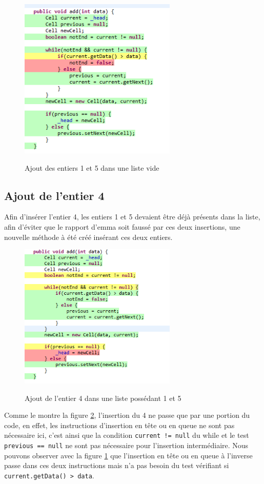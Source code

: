 \documentclass[a4paper, 11pt]{article}
\begin{document}
	\begin{figure}[H]
		\centering
		\includegraphics[width=7.5cm]{screens/ajout1-5.png}
		\label{fig:1erEntiers}
		\caption{Ajout des entiers 1 et 5 dans une liste vide}
	\end{figure}

	\subsection{Ajout de l'entier 4}
	Afin d'insérer l'entier 4, les entiers 1 et 5 devaient être déjà présents dans la liste, afin
	d'éviter que le rapport d'emma soit faussé par ces deux insertions, une nouvelle méthode à été créé insérant ces deux entiers.

	\begin{figure}[H]
		\centering
		\includegraphics[width=7.5cm]{screens/ajout4.png}
		\label{fig:entier4}
		\caption{Ajout de l'entier 4 dans une liste possédant 1 et 5}
	\end{figure}
	
	Comme le montre la figure \ref{fig:entier4}, l'insertion du 4 ne passe que par une portion du code, en effet, les instructions d'insertion en tête
	ou en queue ne sont pas nécessaire ici, c'est ainsi que la condition \texttt{current != null} du while et le test \texttt{previous == null} ne sont
	pas nécessaire pour l'insertion intermédiaire. Nous pouvons observer avec la figure \ref{fig:1erEntiers} que l'insertion en tête ou en queue à
	l'inverse passe dans ces deux instructions mais n'a pas besoin du test vérifiant si \texttt{current.getData() > data}.
\end{document}
